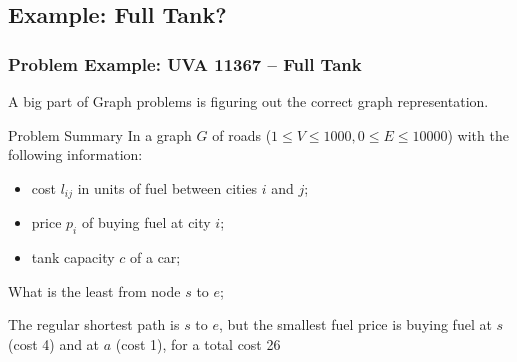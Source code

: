 \documentclass{beamer}
\begin{document}
\subsection{Example: Full Tank?}
\begin{frame}
  \frametitle{Problem Example: UVA 11367 -- Full Tank} 
  {\smaller 
    A big part of Graph problems is figuring out the correct graph
    representation.

  \begin{block}{Problem Summary}
    In a graph $G$ of roads ($1 \leq V \leq 1000, 0 \leq E \leq
    10000$) with the following information:
    \begin{itemize}
    \item cost $l_{ij}$ in units of fuel between cities $i$ and $j$;
    \item price $p_{i}$ of buying fuel at city $i$;
    \item tank capacity $c$ of a car;
    \end{itemize}
    What is the least  from node $s$ to $e$; 
  \end{block}
  
   \begin{center}
  \end{center}
  
   The regular shortest path is $s$ to $e$, but the smallest fuel
   price is buying fuel at $s$ (cost 4) and at $a$ (cost 1), for a total cost 26}
\end{frame}
\end{document}
